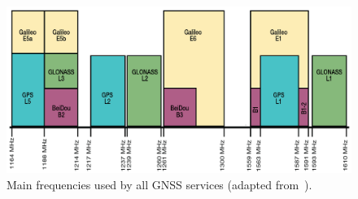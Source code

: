 \begin{figure}[ht]
	\centering
	\includegraphics[width=1.0\textwidth]{Chapters/Figures/global_frequencies.png}
	\caption{Main frequencies used by all GNSS services (adapted from~\cite{novatel_gnss}).}
	\label{fig:global_frequencies}
\end{figure}






